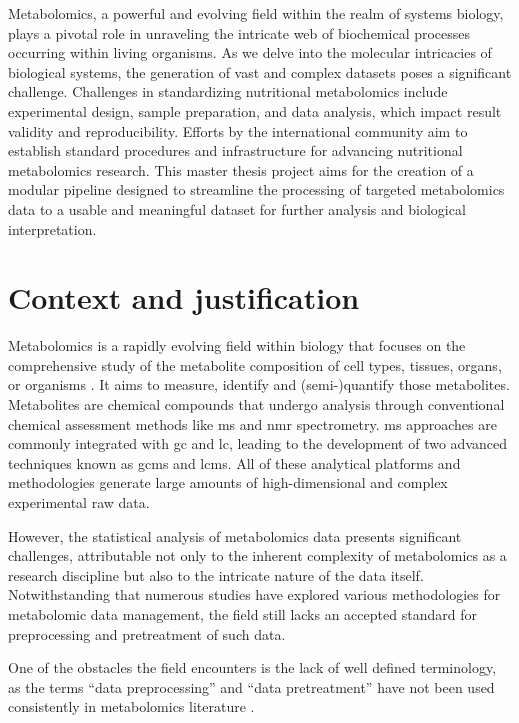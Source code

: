 \documentclass[ENG, BIB]{TFUOC}%
\begin{document}
Metabolomics, a powerful and evolving field within the realm of systems biology, plays a pivotal role in unraveling the intricate web of biochemical processes occurring within living organisms. As we delve into the molecular intricacies of biological systems, the generation of vast and complex datasets poses a significant challenge. Challenges in standardizing nutritional metabolomics include experimental design, sample preparation, and data analysis, which impact result validity and reproducibility. Efforts by the international community aim to establish standard procedures and infrastructure for advancing nutritional metabolomics research. This master thesis project aims for the creation of a modular pipeline designed to streamline the processing of targeted metabolomics data to a usable and meaningful dataset for further analysis and biological interpretation.

\section{Context and justification}

Metabolomics is a rapidly evolving field within biology that focuses on the comprehensive study of the metabolite composition of cell types, tissues, organs, or organisms \cite{pattiMetabolomicsApogeeOmics2012,zhangSerumMetabolomicsNovel2012,chenGuideMetabolomicsAnalysis2022a}. It aims to measure, identify and (semi-)quantify those metabolites. Metabolites are chemical compounds that undergo analysis through conventional chemical assessment methods like \gls{ms} and \gls{nmr} spectrometry. \gls{ms} approaches are commonly integrated with \gls{gc} and \gls{lc}, leading to the development of two advanced techniques known as \gls{gcms} and \gls{lcms}. All of these analytical platforms and methodologies generate large amounts of high-dimensional and complex experimental raw data.

However, the statistical analysis of metabolomics data presents significant challenges, attributable not only to the inherent complexity of metabolomics as a research discipline but also to the intricate nature of the data itself. Notwithstanding that numerous studies have explored various methodologies for metabolomic data management, the field still lacks an accepted standard for preprocessing and pretreatment of such data.

One of the obstacles the field encounters is the lack of well defined terminology, as the terms “data preprocessing” and “data pretreatment” have not been used consistently in metabolomics literature \cite{sunPretreatingNormalizingMetabolomics2024}.
\end{document}
